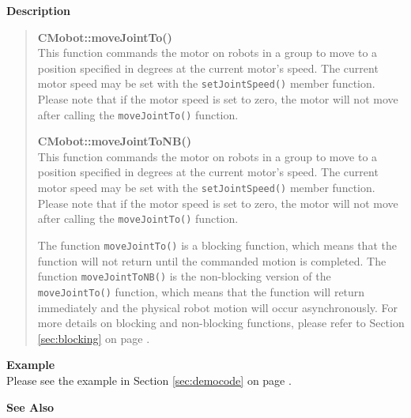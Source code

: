 \noindent
{\bf Description}\\
\vspace{-12pt}
\begin{quote}
{\bf CMobot::moveJointTo()}\\
This function commands the motor on robots in a group to move to a position specified in degrees at
the current motor's speed. The current motor speed may be set with the
\texttt{setJointSpeed()} member function. Please note that if the motor speed
is set to zero, the motor will not move after calling the
\texttt{moveJointTo()} function. 

{\bf CMobot::moveJointToNB()}\\
This function commands the motor on robots in a group to move to a position specified in degrees at
the current motor's speed. The current motor speed may be set with the
\texttt{setJointSpeed()} member function. Please note that if the motor speed
is set to zero, the motor will not move after calling the
\texttt{moveJointTo()} function. 

The function \texttt{moveJointTo()} is a blocking function, which means that 
the function will not return until the commanded motion is 
completed. The function \texttt{moveJointToNB()} is the non-blocking version of
the \texttt{moveJointTo()} function, which means that the function will return
immediately and the physical robot motion will occur asynchronously. For
more details on blocking and non-blocking functions, please refer to 
Section \ref{sec:blocking} on page \pageref{sec:blocking}.\\
\end{quote}
\noindent
{\bf Example}\\
Please see the example in Section \ref{sec:democode} on page \pageref{sec:democode}.\\
\noindent

\noindent
{\bf See Also}\\

